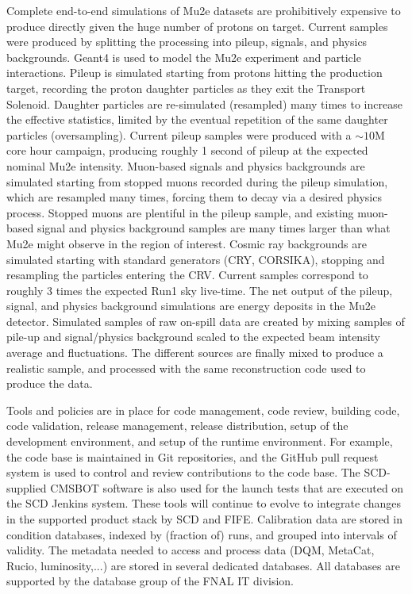 Complete end-to-end simulations of Mu2e datasets are prohibitively expensive to produce directly given the huge number of protons on target. Current samples were produced by splitting the processing into pileup, signals, and physics backgrounds. Geant4 is used to model the Mu2e experiment and particle interactions. Pileup is simulated starting from protons hitting the production target, recording the proton daughter particles as they exit the Transport Solenoid. Daughter particles are re-simulated (resampled) many times to increase the effective statistics, limited by the eventual repetition of the same daughter particles (oversampling). Current pileup samples were produced with a $\sim 10$M core hour campaign, producing roughly 1 second of pileup at the expected nominal Mu2e intensity. Muon-based signals and physics backgrounds are simulated starting from stopped muons recorded during the pileup simulation, which are resampled many times, forcing them to decay via a desired physics process. Stopped muons are plentiful in the pileup sample, and existing muon-based signal and physics background samples are many times larger than what Mu2e might observe in the region of interest. Cosmic ray backgrounds are simulated starting with standard generators (CRY, CORSIKA), stopping and resampling the particles entering the CRV. Current samples correspond to roughly 3 times the expected Run1 sky live-time. The net output of the pileup, signal, and physics background simulations are energy deposits in the Mu2e detector. Simulated samples of raw on-spill data are created by mixing samples of pile-up and signal/physics background scaled to the expected beam intensity average and fluctuations. The different sources are finally mixed to produce a realistic sample, and processed with the same reconstruction code used to produce the data. 

Tools and policies are in place for code management, code review, building code, code validation, release management, release distribution, setup of the development environment, and setup of the runtime environment. For example, the code base is maintained in Git repositories, and the GitHub pull request system is used to control and review contributions to the code base. The SCD-supplied CMSBOT software is also used for the launch tests that are executed on the SCD Jenkins system. These tools will continue to evolve to integrate changes in the supported product stack by SCD and FIFE. Calibration data are stored in condition databases, indexed by (fraction of) runs, and grouped into intervals of validity. The metadata needed to access and process data (DQM, MetaCat, Rucio, luminosity,...) are stored in several dedicated databases. All databases are supported by the database group of the FNAL IT division. 

